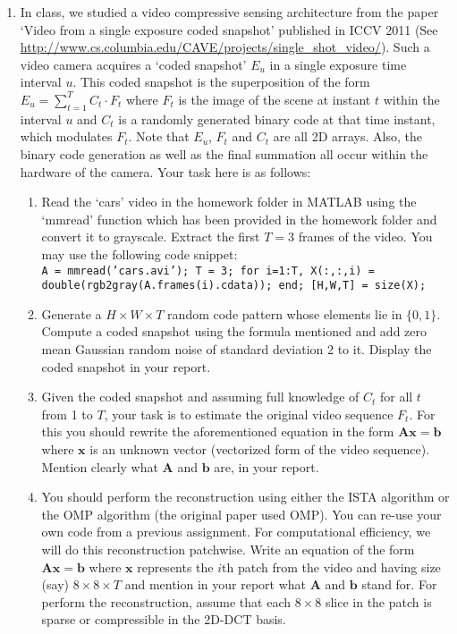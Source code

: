 \documentclass[11pt]{article}
\begin{document}
\begin{enumerate}
\item In class, we studied a video compressive sensing architecture from the paper `Video from a single exposure coded snapshot' published in ICCV 2011 (See \url{http://www.cs.columbia.edu/CAVE/projects/single_shot_video/}). Such a video camera acquires a `coded snapshot' $E_u$ in a single exposure time interval $u$. This coded snapshot is the superposition of the form $E_u = \sum_{t=1}^T C_t \cdot F_t$ where $F_t$ is the image of the scene at instant $t$ within the interval $u$ and $C_t$ is a randomly generated binary code at that time instant, which modulates $F_t$. Note that $E_u$, $F_t$ and $C_t$ are all 2D arrays. Also, the binary code generation as well as the final summation all occur within the hardware of the camera. Your task here is as follows:
\begin{enumerate}
\item Read the `cars' video in the homework folder in MATLAB using the `mmread' function which has been provided in the homework folder and convert it to grayscale. Extract the first $T = 3$ frames of the video. You may use the following code snippet: \\
\texttt{A = mmread('cars.avi');
T = 3;
for i=1:T,  X(:,:,i) = double(rgb2gray(A.frames(i).cdata)); end;
[H,W,T] = size(X);
}
\item Generate a $H \times W \times T$ random code pattern whose elements lie in $\{0,1\}$. Compute a coded snapshot using the formula mentioned and add zero mean Gaussian random noise of standard deviation 2 to it. Display the coded snapshot in your report.
\item Given the coded snapshot and assuming full knowledge of $C_t$ for all $t$ from 1 to $T$, your task is to estimate the original video sequence $F_t$. For this you should rewrite the aforementioned equation in the form $\boldsymbol{Ax} = \boldsymbol{b}$ where $\boldsymbol{x}$ is an unknown vector (vectorized form of the video sequence). Mention clearly what $\boldsymbol{A}$ and $\boldsymbol{b}$ are, in your report.
\item You should perform the reconstruction using either the ISTA algorithm or the OMP algorithm (the original paper used OMP). You can re-use your own code from a previous assignment. For computational efficiency, we will do this reconstruction patchwise. Write an equation of the form $\boldsymbol{Ax} = \boldsymbol{b}$ where $\boldsymbol{x}$ represents the $i$th patch from the video and having size (say) $8 \times 8 \times T$ and mention in your report what $\boldsymbol{A}$ and $\boldsymbol{b}$ stand for. For perform the reconstruction, assume that each $8 \times 8$ slice in the patch is sparse or compressible in the 2D-DCT basis. 

\end{enumerate}
\end{enumerate}
\end{document}
